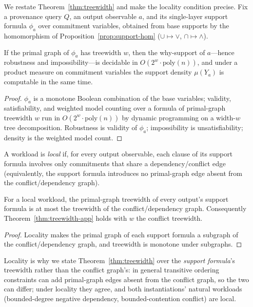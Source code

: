 We restate Theorem~\ref{thm:treewidth} and make the locality condition
precise. Fix a provenance query $Q$, an output observable $a$, and its
single-layer support formula $\phi_a$ over commitment variables, obtained from
base supports by the homomorphism of Proposition~\ref{prop:support-hom}
($\cup \mapsto \vee$, $\cap \mapsto \wedge$).

\begin{theorem}
  \label{thm:treewidth-app}
  If the primal graph of $\phi_a$ has treewidth $w$, then the why-support of
  $a$---hence robustness and impossibility---is decidable in
  $O(2^w \cdot \mathrm{poly}(n))$, and under a product measure on commitment
  variables the support density $\mu(Y_a)$ is computable in the same time.
\end{theorem}
\begin{proof}
  $\phi_a$ is a monotone Boolean combination of the base variables; validity,
  satisfiability, and weighted model counting over a formula of primal-graph
  treewidth $w$ run in $O(2^w \cdot \mathrm{poly}(n))$ by dynamic programming
  on a width-$w$ tree decomposition. Robustness is validity of $\phi_a$;
  impossibility is unsatisfiability; density is the weighted model count.
\end{proof}

\begin{definition}[Locality]
  \label{def:locality}
  A workload is \emph{local} if, for every output observable, each clause of
  its support formula involves only commitments that share a
  dependency/conflict edge (equivalently, the support formula introduces no
  primal-graph edge absent from the conflict/dependency graph).
\end{definition}

\begin{proposition}
  \label{prop:locality}
  For a local workload, the primal-graph treewidth of every output's support
  formula is at most the treewidth of the conflict/dependency graph.
  Consequently Theorem~\ref{thm:treewidth-app} holds with $w$ the conflict
  treewidth.
\end{proposition}
\begin{proof}
  Locality makes the primal graph of each support formula a subgraph of the
  conflict/dependency graph, and treewidth is monotone under subgraphs.
\end{proof}

\noindent
Locality is why we state Theorem~\ref{thm:treewidth} over the \emph{support
formula}'s treewidth rather than the conflict graph's: in general transitive
ordering constraints can add primal-graph edges absent from the conflict
graph, so the two can differ; under locality they agree, and both
instantiations' natural workloads (bounded-degree negative dependency,
bounded-contention conflict) are local.
